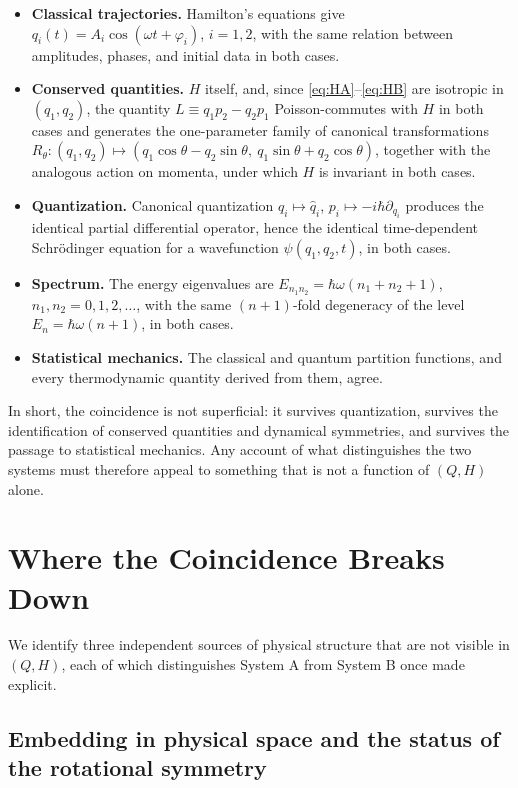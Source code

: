 \documentclass[11pt]{article}
\begin{document}
\begin{itemize}
\item \textbf{Classical trajectories.} Hamilton's equations give $q_i(t)=A_i\cos(\omega t+\varphi_i)$, $i=1,2$, with the same relation between amplitudes, phases, and initial data in both cases.
\item \textbf{Conserved quantities.} $H$ itself, and, since \eqref{eq:HA}--\eqref{eq:HB} are isotropic in $(q_1,q_2)$, the quantity $L\equiv q_1p_2-q_2p_1$ Poisson-commutes with $H$ in both cases and generates the one-parameter family of canonical transformations $R_\theta:(q_1,q_2)\mapsto(q_1\cos\theta-q_2\sin\theta,\ q_1\sin\theta+q_2\cos\theta)$, together with the analogous action on momenta, under which $H$ is invariant in both cases.
\item \textbf{Quantization.} Canonical quantization $q_i\mapsto \hat q_i$, $p_i\mapsto-i\hbar\partial_{q_i}$ produces the identical partial differential operator, hence the identical time-dependent Schr\"odinger equation for a wavefunction $\psi(q_1,q_2,t)$, in both cases.
\item \textbf{Spectrum.} The energy eigenvalues are $E_{n_1n_2}=\hbar\omega(n_1+n_2+1)$, $n_1,n_2=0,1,2,\dots$, with the same $(n+1)$-fold degeneracy of the level $E_n=\hbar\omega(n+1)$, in both cases.
\item \textbf{Statistical mechanics.} The classical and quantum partition functions, and every thermodynamic quantity derived from them, agree.
\end{itemize}

In short, the coincidence is not superficial: it survives quantization, survives the identification of conserved quantities and dynamical symmetries, and survives the passage to statistical mechanics. Any account of what distinguishes the two systems must therefore appeal to something that is not a function of $(Q,H)$ alone.

\section{Where the Coincidence Breaks Down}

We identify three independent sources of physical structure that are not visible in $(Q,H)$, each of which distinguishes System A from System B once made explicit.

\subsection{Embedding in physical space and the status of the rotational symmetry}
\end{document}
